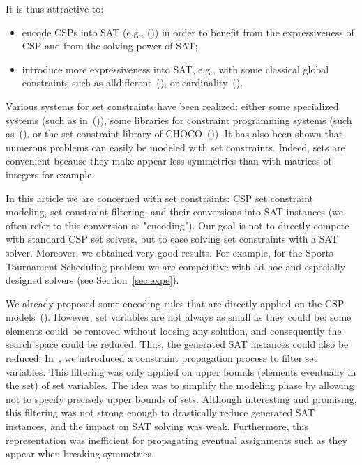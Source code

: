 \documentclass[3p,authoryear,times]{elsarticle}
\begin{document}
\medskip

It is thus attractive to:
\begin{itemize}
\item encode CSPs into SAT (e.g., (\cite{bacchusCP2007,bessiereSAT2003})) in order to benefit from the expressiveness of CSP and from the solving power of SAT;
\item  introduce more expressiveness into SAT, e.g., with some classical global constraints such as alldifferent~(\cite{micai2009}), or cardinality~(\cite{Bailleux03}).
\end{itemize} 



Various systems for set constraints have been realized: either some specialized systems (such as in~(\cite{azevedoThesis,azevedoConstraint07})), some libraries for constraint programming systems (such as~(\cite{ConjuntoILPS94}), or the set constraint library of CHOCO~(\cite{choco})). It has also been  shown that numerous problems can easily be modeled with set constraints. Indeed, sets are convenient because they make appear less symmetries than with matrices of integers for example.

In this article we are concerned with set constraints: CSP set constraint modeling, set constraint filtering, and their conversions into SAT instances (we often refer to this conversion as "encoding"). 
Our goal is not to directly compete with standard CSP set solvers, but to ease solving set constraints with a SAT solver. Moreover, we obtained very good results. For example, for the Sports Tournament Scheduling problem we are competitive with ad-hoc and especially designed solvers (see Section~\ref{sec:expe}).
\medskip


We already proposed some encoding rules that are directly applied on the CSP models~(\cite{aor}). However,  set variables are not always as small as they could be: some elements could be removed without loosing any solution, and consequently the search space could be reduced. Thus, the generated SAT instances could also be reduced. In~\cite{aisc2014}, we introduced a constraint propagation process to filter set variables. This filtering was only applied on upper bounds (elements eventually in the set) of set variables. The idea was to simplify the modeling phase by allowing not to specify precisely upper bounds of sets.
Although interesting and promising, this filtering was not strong enough to drastically reduce generated SAT instances, and the impact on SAT solving was weak. Furthermore, this representation was inefficient for propagating eventual assignments such as they appear when breaking symmetries. 
\end{document}
